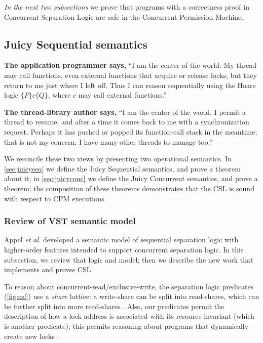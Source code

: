 \vspace{1ex}
\emph{In the next two subsections}
we prove that programs with a correctness proof in Concurrent Separation Logic are
safe in the Concurrent Permission Machine.  

\subsection{Juicy Sequential semantics}
\label{sec:juicyseq}


\noindent
\begin{minipage}[t]{2.6in}
  \noindent \textbf{The application programmer says,}
  ``I am the center of the world.  
  My thread may call functions,
  even external functions that acquire or release locks,
  but they return to me just where I left off.
  Thus I can reason sequentially using the
  Hoare logic $\{P\}c\{Q\}$, where
  $c$ may call external functions.''
  \end{minipage}\hfill
\begin{minipage}[t]{2.6in}
  \noindent \textbf{The thread-library author says,}
  ``I am the center of the world.  I permit
  a thread to resume, and after a time it comes
  back to me with a synchronization request.  Perhaps
  it has pushed or popped its function-call stack
  in the meantime; that is not my concern; I have
  many other threads to manage too.''
  \end{minipage}

\vspace{1ex}
We reconcile these two views by presenting two
operational semantics. In \autoref{sec:juicyseq}
we define the Juicy Sequential semantics, and prove a theorem about it;
in \autoref{sec:juicyconc} we define the Juicy Concurrent semantics, and prove a theorem;
the composition of these theorems demonstrates that
the CSL is sound with respect to CPM executions.

\subsubsection{Review of VST semantic model}
\label{subsec:vst-review}
Appel \emph{et al.} \cite{appel14:plcc} developed a semantic model of sequential separation logic
with higher-order features intended to support concurrent separation logic.
In this subsection, we review that logic and model;
then we describe the new work that implements and proves CSL.

To reason about concurrent-read/exclusive-write,
the separation logic predicates (\autoref{fig:csl}) use a
\emph{share} lattice: a write-share can be split into read-shares,
which can be further split into more read-shares
\cite[Chapters 11,41]{appel14:plcc}.
Also, our predicates permit the description
of how a lock address is associated with its resource invariant
(which is another predicate); this permits reasoning about
programs that dynamically create new locks \cite[Chapter 30]{appel14:plcc}.

